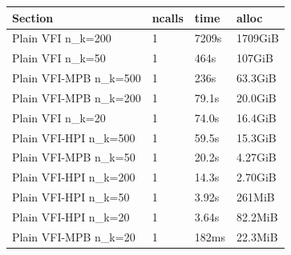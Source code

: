 \documentclass[]{article}
\begin{document}
\begin{longtable}[]{@{}llll@{}}
\toprule
Section & ncalls & time & alloc\tabularnewline
\midrule
\endhead
Plain VFI n\_k=200 & 1 & 7209s & 1709GiB\tabularnewline
Plain VFI n\_k=50 & 1 & 464s & 107GiB\tabularnewline
Plain VFI-MPB n\_k=500 & 1 & 236s & 63.3GiB\tabularnewline
Plain VFI-MPB n\_k=200 & 1 & 79.1s & 20.0GiB\tabularnewline
Plain VFI n\_k=20 & 1 & 74.0s & 16.4GiB\tabularnewline
Plain VFI-HPI n\_k=500 & 1 & 59.5s & 15.3GiB\tabularnewline
Plain VFI-MPB n\_k=50 & 1 & 20.2s & 4.27GiB\tabularnewline
Plain VFI-HPI n\_k=200 & 1 & 14.3s & 2.70GiB\tabularnewline
Plain VFI-HPI n\_k=50 & 1 & 3.92s & 261MiB\tabularnewline
Plain VFI-HPI n\_k=20 & 1 & 3.64s & 82.2MiB\tabularnewline
Plain VFI-MPB n\_k=20 & 1 & 182ms & 22.3MiB\tabularnewline
\bottomrule
\end{longtable}
\end{document}
